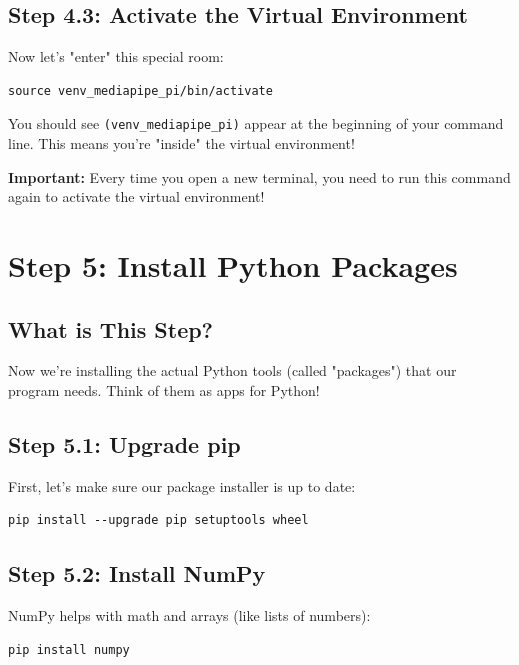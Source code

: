 \documentclass[12pt,a4paper]{article}
\begin{document}
\subsection{Step 4.3: Activate the Virtual Environment}

Now let's "enter" this special room:

\begin{lstlisting}
source venv_mediapipe_pi/bin/activate
\end{lstlisting}

You should see \texttt{(venv\_mediapipe\_pi)} appear at the beginning of your command line. This means you're "inside" the virtual environment!

\begin{warningbox}
\textbf{Important:} Every time you open a new terminal, you need to run this command again to activate the virtual environment!
\end{warningbox}

\section{Step 5: Install Python Packages}

\subsection{What is This Step?}

Now we're installing the actual Python tools (called "packages") that our program needs. Think of them as apps for Python!

\subsection{Step 5.1: Upgrade pip}

First, let's make sure our package installer is up to date:

\begin{lstlisting}
pip install --upgrade pip setuptools wheel
\end{lstlisting}

\subsection{Step 5.2: Install NumPy}

NumPy helps with math and arrays (like lists of numbers):

\begin{lstlisting}
pip install numpy
\end{lstlisting}
\end{document}

